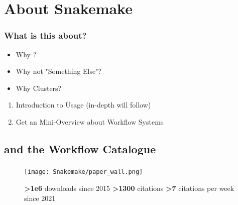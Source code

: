 \section{About Snakemake}
{   
}

\begin{frame}
	\frametitle{What is this about?}
	\begin{question}[Questions]
		\begin{itemize}
			\item Why \Snakemake?
			\item Why not "Something Else"?
			\item Why Clusters?
		\end{itemize}
	\end{question}
	\begin{docs}[Objectives]
		\begin{enumerate}
			\item Introduction to \Snakemake Usage (in-depth will follow)
			\item Get an Mini-Overview about Workflow Systems
		\end{enumerate}
	\end{docs}
\end{frame}

\subsection{\Snakemake and the Workflow Catalogue}

\begin{frame}
	\frametitle{\Snakemake}
	\begin{figure}
		\centering
		\caption*{\textbf{>1e6} downloads since 2015\newline
			\textbf{>1300} citations\newline
			\textbf{>7} citations per week since 2021}
		\texttt{[image: Snakemake/paper\_wall.png]}
	\end{figure}
\end{frame}

